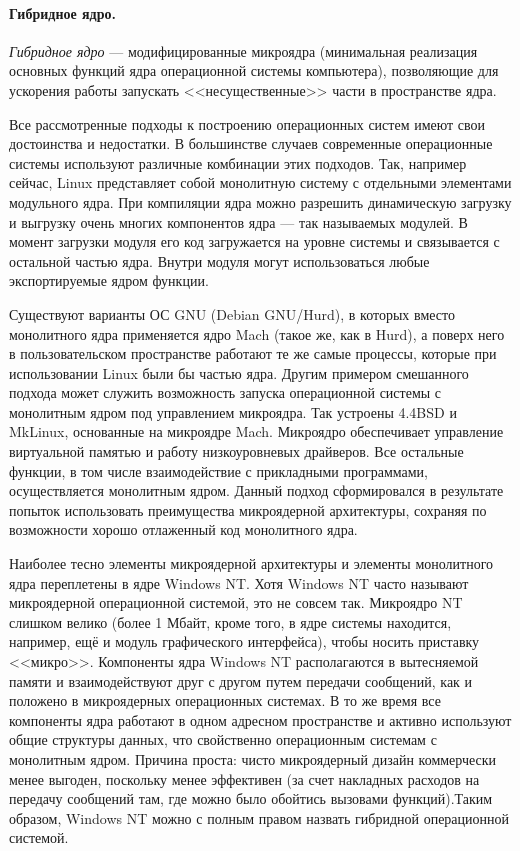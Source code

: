 \paragraph{Гибридное ядро.} \emph{Гибридное ядро} --- модифицированные микроядра (минимальная реализация основных функций ядра операционной системы компьютера), позволяющие для ускорения работы запускать <<несущественные>> части в пространстве ядра.

Все рассмотренные подходы к построению операционных систем имеют свои достоинства и недостатки. В большинстве случаев современные операционные системы используют различные комбинации этих подходов. Так, например сейчас, Linux представляет собой монолитную систему с отдельными элементами модульного ядра. При компиляции ядра можно разрешить динамическую загрузку и выгрузку очень многих компонентов ядра --- так называемых модулей. В момент загрузки модуля его код загружается на уровне системы и связывается с остальной частью ядра. Внутри модуля могут использоваться любые экспортируемые ядром функции.

Существуют варианты ОС GNU (Debian GNU/Hurd), в которых вместо монолитного ядра применяется ядро Mach (такое же, как в Hurd), а поверх него в пользовательском пространстве работают те же самые процессы, которые при использовании Linux были бы частью ядра. Другим примером смешанного подхода может служить возможность запуска операционной системы с монолитным ядром под управлением микроядра. Так устроены 4.4BSD и MkLinux, основанные на микроядре Mach. Микроядро обеспечивает управление виртуальной памятью и работу низкоуровневых драйверов. Все остальные функции, в том числе взаимодействие с прикладными программами, осуществляется монолитным ядром. Данный подход сформировался в результате попыток использовать преимущества микроядерной архитектуры, сохраняя по возможности хорошо отлаженный код монолитного ядра.

Наиболее тесно элементы микроядерной архитектуры и элементы монолитного ядра переплетены в ядре Windows NT. Хотя Windows NT часто называют микроядерной операционной системой, это не совсем так. Микроядро NT слишком велико (более 1 Мбайт, кроме того, в ядре системы находится, например, ещё и модуль графического интерфейса), чтобы носить приставку <<микро>>. Компоненты ядра Windows NT располагаются в вытесняемой памяти и взаимодействуют друг с другом путем передачи сообщений, как и положено в микроядерных операционных системах. В то же время все компоненты ядра работают в одном адресном пространстве и активно используют общие структуры данных, что свойственно операционным системам с монолитным ядром. Причина проста: чисто микроядерный дизайн коммерчески менее выгоден, поскольку менее эффективен (за счет накладных расходов на передачу сообщений там, где можно было обойтись вызовами функций).Таким образом, Windows NT можно с полным правом назвать гибридной операционной системой.

